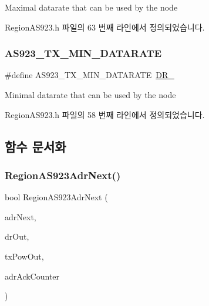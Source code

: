 Maximal datarate that can be used by the node 

Region\+A\+S923.\+h 파일의 63 번째 라인에서 정의되었습니다.

\mbox{\label{group___r_e_g_i_o_n_a_s923_gab6f2badbf9a4eb4038301759c0f7fc77}} 
\subsubsection{\texorpdfstring{A\+S923\+\_\+\+T\+X\+\_\+\+M\+I\+N\+\_\+\+D\+A\+T\+A\+R\+A\+TE}{AS923\_TX\_MIN\_DATARATE}}
{\footnotesize\ttfamily \#define A\+S923\+\_\+\+T\+X\+\_\+\+M\+I\+N\+\_\+\+D\+A\+T\+A\+R\+A\+TE~\mbox{\hyperlink{group___r_e_g_i_o_n_ga6c4ef966b4f3d5eb7597b087f2b97095}{D\+R\+\_}}}

Minimal datarate that can be used by the node 

Region\+A\+S923.\+h 파일의 58 번째 라인에서 정의되었습니다.



\subsection{함수 문서화}
\mbox{\label{group___r_e_g_i_o_n_a_s923_ga38146f12b31fadadda54344d9f5d7e49}} 
\subsubsection{\texorpdfstring{Region\+A\+S923\+Adr\+Next()}{RegionAS923AdrNext()}}
{\footnotesize\ttfamily bool Region\+A\+S923\+Adr\+Next (\begin{DoxyParamCaption}\item[{\mbox{\hyperlink{group___r_e_g_i_o_n_ga567c2742622326b350b4e91bbf61b4ce}{Adr\+Next\+Params\+\_\+t}} $\ast$}]{adr\+Next,  }\item[{int8\+\_\+t $\ast$}]{dr\+Out,  }\item[{int8\+\_\+t $\ast$}]{tx\+Pow\+Out,  }\item[{uint32\+\_\+t $\ast$}]{adr\+Ack\+Counter }\end{DoxyParamCaption})}



